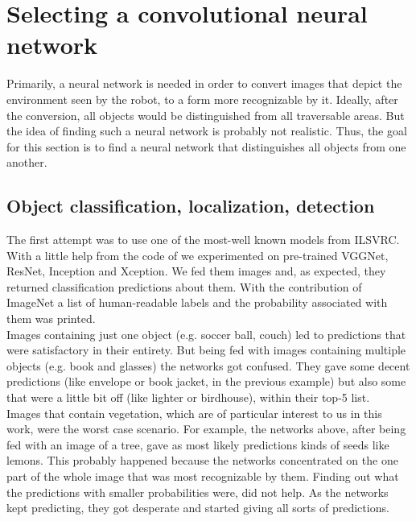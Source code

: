 \documentclass[12pt,a4paper,table,dvipsnames,tikz]{report}
\newcommand{\acronym}{\MakeUppercase}
\begin{document}
	\section{Selecting a convolutional neural network}
	\label{sec:fg:nn}
	
	Primarily, a neural network is needed in order to convert images that depict the 
	environment seen by the robot, to a form more recognizable by it. Ideally, after 
	the conversion, all objects would be distinguished from all traversable areas. But 
	the idea of finding such a neural network is probably not realistic. Thus, the goal 
	for this section is to find a neural network that distinguishes all objects from 
	one another.
	\\
	
	\subsection{Object classification, localization, detection}
	\label{sec:fg:nn:obj}
	
	The first attempt was to use one of the most-well known models from \acronym{ilsvrc}. 
	With a little help from the code of \citet{Rosebrocke} we experimented on 
	pre-trained VGGNet, ResNet, Inception and Xception. We fed them images and, 
	as expected, they returned classification predictions about them. With the 
	contribution of ImageNet a list of human-readable labels and the probability 
	associated with them was printed.
	\\
	
	Images containing just one object (e.g. soccer ball, couch) led to predictions 
	that were satisfactory in their entirety. But being fed with images containing 
	multiple objects (e.g. book and glasses) the networks got confused. They gave 
	some decent predictions (like envelope or book jacket, in the previous example) 
	but also some that were a little bit off (like lighter or birdhouse), within 
	their top-5 list.
	\\
	
	Images that contain vegetation, which are of particular interest to us in this work, 
	were the worst case scenario. For example, the networks above, after being fed with 
	an image of a tree, gave as most likely predictions kinds of seeds like lemons. This 
	probably happened because the networks concentrated on the one part of the whole image 
	that was most recognizable by them. Finding out what the predictions with smaller 
	probabilities were, did not help. As the networks kept predicting, they got desperate 
	and started giving all sorts of predictions. 
	\\
	
\end{document}
